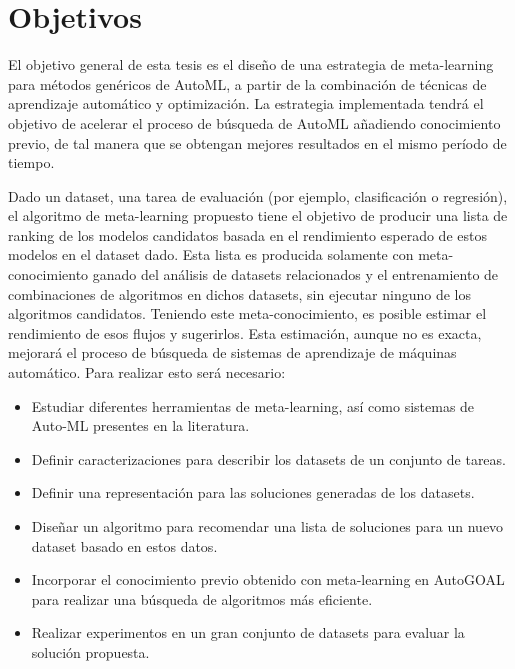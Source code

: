 \section*{Objetivos}

El objetivo general de esta tesis es el diseño de una estrategia de meta-learning para métodos genéricos de AutoML, a partir de la combinación de técnicas de aprendizaje automático y optimización. La estrategia implementada tendrá el objetivo de acelerar el proceso de búsqueda de AutoML añadiendo conocimiento previo, de tal manera que se obtengan mejores resultados en el mismo período de tiempo.

 Dado un dataset, una tarea de evaluación (por ejemplo, clasificación o regresión), el algoritmo de meta-learning propuesto tiene el objetivo de producir una lista de ranking de los modelos candidatos basada en el rendimiento esperado de estos modelos en el dataset dado. Esta lista es producida solamente con meta-conocimiento ganado del análisis de datasets relacionados y el entrenamiento de combinaciones de algoritmos en dichos datasets, sin ejecutar ninguno de los algoritmos candidatos. Teniendo este meta-conocimiento, es posible estimar el rendimiento de esos flujos y sugerirlos. Esta estimación, aunque no es exacta, mejorará el proceso de búsqueda de sistemas de aprendizaje de máquinas automático. Para realizar esto será necesario:
 

\begin{itemize}
	\item Estudiar diferentes herramientas de meta-learning, así como sistemas de Auto-ML presentes en la literatura.
	\item Definir caracterizaciones para describir los datasets de un conjunto de tareas.
	\item Definir una representación para las soluciones generadas de los datasets.
	\item Diseñar un algoritmo para recomendar una lista de soluciones para un nuevo dataset basado en estos datos.
	\item Incorporar el conocimiento previo obtenido con meta-learning en AutoGOAL para realizar una búsqueda de algoritmos más eficiente.
	\item Realizar experimentos en un gran conjunto de datasets para evaluar la solución propuesta.
\end{itemize}

